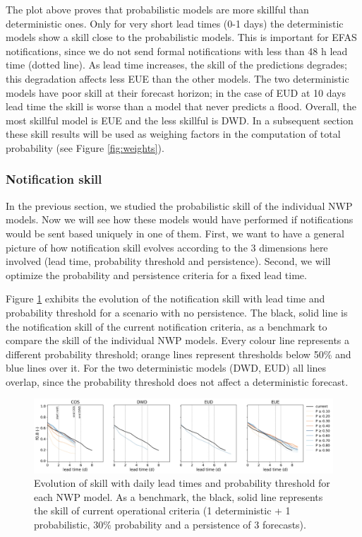 \documentclass[preprint,12pt]{elsarticle}
\begin{document}
The plot above proves that probabilistic models are more skillful than deterministic ones. Only for very short lead times (0-1 days) the deterministic models show a skill close to the probabilistic models. This is important for EFAS notifications, since we do not send formal notifications with less than 48 h lead time (dotted line). As lead time increases, the skill of the predictions degrades; this degradation affects less EUE than the other models. The two deterministic models have poor skill at their forecast horizon; in the case of EUD at 10 days lead time the skill is worse than a model that never predicts a flood. Overall, the most skillful model is EUE and the less skillful is DWD. In a subsequent section these skill results will be used as weighing factors in the computation of total probability (see Figure \ref{fig:weights}).

\subsubsection{Notification skill}
\label{sec:NWP_not_skill}

In the previous section, we studied the probabilistic skill of the individual NWP models. Now we will see how these models would have performed if notifications would be sent based uniquely in one of them. First, we want to have a general picture of how notification skill evolves according to the 3 dimensions here involved (lead time, probability threshold and persistence). Second, we will optimize the probability and persistence criteria for a fixed lead time.

Figure \ref{fig:NWP_skill_leadtime} exhibits the evolution of the notification skill with lead time and probability threshold for a scenario with no persistence. The black, solid line is the notification skill of the current notification criteria, as a benchmark to compare the skill of the individual NWP models. Every colour line represents a different probability threshold; orange lines represent thresholds below 50\% and blue lines over it. For the two deterministic models (DWD, EUD) all lines overlap, since the probability threshold does not affect a deterministic forecast.

\begin{figure}
    \centering
    \includegraphics[width=1\textwidth]{figures/skill_probability_leadtime_1-1_NWP.jpg}
    \caption{Evolution of skill with daily lead times and probability threshold for each NWP model. As a benchmark, the black, solid line represents the skill of current operational criteria (1 deterministic + 1 probabilistic, 30\% probability and a persistence of 3 forecasts).}
    \label{fig:NWP_skill_leadtime}
\end{figure}
\end{document}
